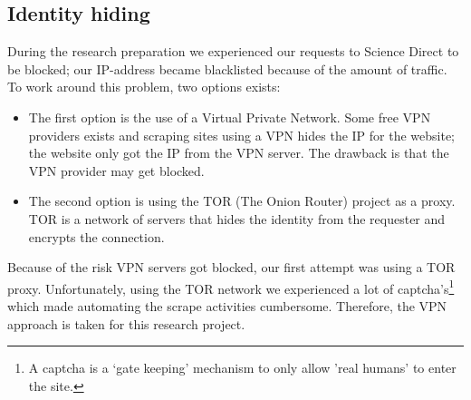 \documentclass{ou-report}
\begin{document}
\subsection{Identity hiding}
During the research preparation we experienced our requests to 
Science Direct to be blocked; our IP-address became blacklisted because of the 
amount of traffic. To work around this problem, two options exists:

\begin{itemize}
\item The first option is the use of a Virtual Private Network. Some free VPN 
providers exists and scraping sites using a VPN hides the IP for the website; 
the website only got the IP from the VPN server. The drawback is that the VPN
provider may get blocked.

\item The second option is using the TOR (The Onion Router) project as a proxy. 
TOR is a network of 
servers that hides the identity from the requester and encrypts the 
connection.
\end{itemize}

Because of the risk VPN servers got blocked, our first attempt was using a TOR 
proxy. 
Unfortunately, using the TOR network we experienced a lot of captcha's\footnote{A 
captcha is a `gate keeping' mechanism to only allow 'real humans' to enter the 
site.} which 
made automating the scrape activities cumbersome.
Therefore, the VPN approach is taken for this research project.



\end{document}
